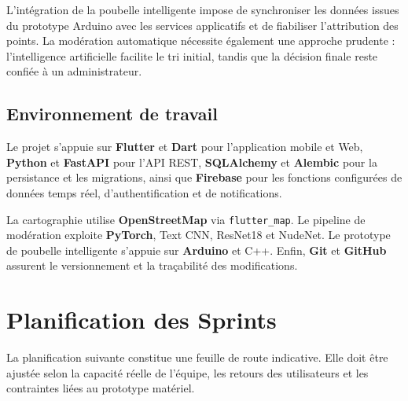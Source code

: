 L'intégration de la poubelle intelligente impose de synchroniser les données issues du prototype Arduino avec les services applicatifs et de fiabiliser l'attribution des points. La modération automatique nécessite également une approche prudente : l'intelligence artificielle facilite le tri initial, tandis que la décision finale reste confiée à un administrateur.

\subsection{Environnement de travail}
\label{subsec:environnement_travail}

Le projet s'appuie sur \textbf{Flutter} et \textbf{Dart} pour l'application mobile et Web, \textbf{Python} et \textbf{FastAPI} pour l'API REST, \textbf{SQLAlchemy} et \textbf{Alembic} pour la persistance et les migrations, ainsi que \textbf{Firebase} pour les fonctions configurées de données temps réel, d'authentification et de notifications.

La cartographie utilise \textbf{OpenStreetMap} via \texttt{flutter\_map}. Le pipeline de modération exploite \textbf{PyTorch}, Text CNN, ResNet18 et NudeNet. Le prototype de poubelle intelligente s'appuie sur \textbf{Arduino} et C++. Enfin, \textbf{Git} et \textbf{GitHub} assurent le versionnement et la traçabilité des modifications.

\section{Planification des Sprints}
\label{sec:planification_sprints}

La planification suivante constitue une feuille de route indicative. Elle doit être ajustée selon la capacité réelle de l'équipe, les retours des utilisateurs et les contraintes liées au prototype matériel.

